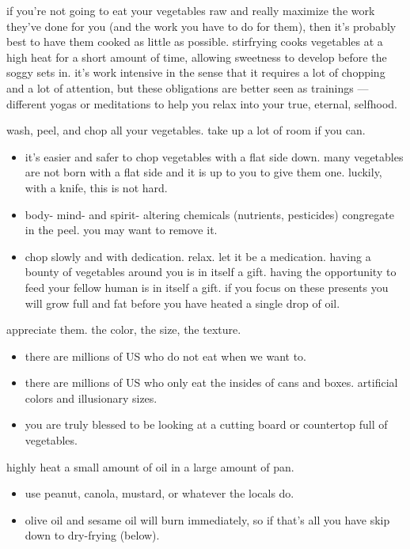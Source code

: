 if you're not going to eat your vegetables raw and really maximize the work 
they've done for you (and the work you have to do for them), then it's 
probably best to have them cooked as little as possible. stirfrying cooks 
vegetables at a high heat for a short amount of time, allowing sweetness to 
develop before the soggy sets in. it's work intensive in the sense that it 
requires a lot of chopping and a lot of attention, but these obligations are 
better seen as trainings --- different yogas or meditations to help you relax 
into your true, eternal, selfhood.

\begin{algorithm}

  \item wash, peel, and chop all your vegetables. take up a lot of room if you 
  can.
  \begin{itemize}
    \item it's easier and safer to chop vegetables with a flat side down. many vegetables are not born with a flat side and it is up to you to give them one. luckily, with a knife, this is not hard.
    \item body- mind- and spirit- altering chemicals (nutrients, pesticides) congregate in the peel. you may want to remove it.
    \item chop slowly and with dedication. relax. let it be a medication. having a bounty of vegetables around you is in itself a gift. having the opportunity to feed your fellow human is in itself a gift. if you focus on these presents you will grow full and fat before you have heated a single drop of oil.
  \end{itemize}

  \item appreciate them. the color, the size, the texture.
  \begin{itemize}
    \item there are millions of US who do not eat when we want to.
    \item there are millions of US who only eat the insides of cans and boxes. artificial colors and illusionary sizes.
    \item you are truly blessed to be looking at a cutting board or countertop full of vegetables.
  \end{itemize}

  \item highly heat a small amount of oil in a large amount of pan.
  \begin{itemize}
    \item use peanut, canola, mustard, or whatever the locals do.
    \item olive oil and sesame oil will burn immediately, so if that's all you have skip down to dry-frying (below).
  \end{itemize}


\end{algorithm}
